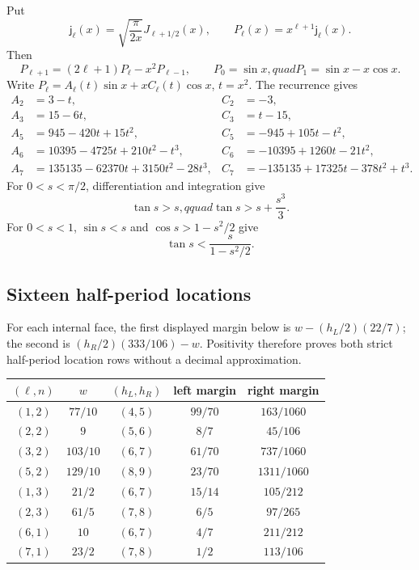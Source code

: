 \documentclass[11pt]{article}
\begin{document}
Put
\[
 \mathsf j_\ell(x)=\sqrt{\frac{\pi}{2x}}J_{\ell+1/2}(x),
 \qquad P_\ell(x)=x^{\ell+1}\mathsf j_\ell(x).
\]
Then
\begin{equation}
 P_{\ell+1}=(2\ell+1)P_\ell-x^2P_{\ell-1},
 \qquad P_0=\sin x,quad P_1=\sin x-x\cos x.
 \label{eq:P-rec}
\end{equation}
Write
\(P_\ell=A_\ell(t)\sin x+xC_\ell(t)\cos x\), \(t=x^2\).
The recurrence gives
\begin{align*}
 A_2&=3-t,&C_2&=-3,\\
 A_3&=15-6t,&C_3&=t-15,\\
 A_5&=945-420t+15t^2,&C_5&=-945+105t-t^2,\\
 A_6&=10395-4725t+210t^2-t^3,
 &C_6&=-10395+1260t-21t^2,\\
 A_7&=135135-62370t+3150t^2-28t^3,
 &C_7&=-135135+17325t-378t^2+t^3.
\end{align*}
For \(0<s<\pi/2\), differentiation and integration give
\begin{equation}
 \tan s>s,qquad \tan s>s+\frac{s^3}{3}.
 \label{eq:tan-lower}
\end{equation}
For \(0<s<1\), \(\sin s<s\) and
\(\cos s>1-s^2/2\) give
\begin{equation}
 \tan s<\frac{s}{1-s^2/2}.
 \label{eq:tan-upper}
\end{equation}

\subsection{Sixteen half-period locations}

For each internal face, the first displayed margin below is
\(w-(h_L/2)(22/7)\); the second is
\((h_R/2)(333/106)-w\).  Positivity therefore proves both strict
half-period location rows without a decimal approximation.
\begin{center}
\small
\begin{tabular}{c|c|c|c|c}
\toprule
\((\ell,n)\)&\(w\)&\((h_L,h_R)\)&left margin&right margin\\
\midrule
\((1,2)\)&\(77/10\)&\((4,5)\)&\(99/70\)&\(163/1060\)\\
\((2,2)\)&\(9\)&\((5,6)\)&\(8/7\)&\(45/106\)\\
\((3,2)\)&\(103/10\)&\((6,7)\)&\(61/70\)&\(737/1060\)\\
\((5,2)\)&\(129/10\)&\((8,9)\)&\(23/70\)&\(1311/1060\)\\
\((1,3)\)&\(21/2\)&\((6,7)\)&\(15/14\)&\(105/212\)\\
\((2,3)\)&\(61/5\)&\((7,8)\)&\(6/5\)&\(97/265\)\\
\((6,1)\)&\(10\)&\((6,7)\)&\(4/7\)&\(211/212\)\\
\((7,1)\)&\(23/2\)&\((7,8)\)&\(1/2\)&\(113/106\)\\
\bottomrule
\end{tabular}
\end{center}
\end{document}

